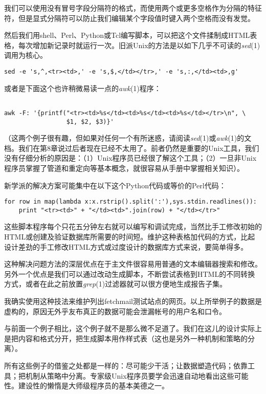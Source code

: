 \documentclass[12pt,oneside]{ctexbook}
\begin{document}
\begin{common-format}
我们可以使用没有冒号字段分隔符的格式，而使用两个或更多空格作为分隔的特征符，但是显式分隔符可以防止我们编辑某个字段值时键入两个空格而没有发觉。

然后我们用shell、Perl、Python或Tcl编写脚本，可以把这个文件揉制成HTML表格，每次增加新记录时就运行一次。旧派Unix的方法是以如下几乎不可读的\textit{sed}(1)调用为核心。

\begin{Verbatim}
sed -e 's,^,<tr><td>,' -e 's,$,</td></tr>,' -e 's,:,</td><td>,g'
\end{Verbatim}

或者是下面这个也许稍微易读一点的\textit{awk}(1)程序：
\begin{Verbatim}

awk -F: '{printf("<tr><td>%s</td><td>%s</td><td>%s</td></tr>\n", \
                 $1, $2, $3)}'
\end{Verbatim}

（这两个例子很有趣，但如果对任何一个有所迷惑，请阅读\textit{sed}(1)或\textit{awk}(1)的文档。我们在第8章说过后者现在已经不太用了。前者仍然是重要的Unix工具，我们没有仔细分析的原因是：（1）Unix程序员已经很了解这个工具；（2）一旦非Unix程序员掌握了管道和重定向等基本概念，就很容易从手册中掌握相关知识）。

新学派的解决方案可能集中在以下这个Python代码或等价的Perl代码：
\begin{Verbatim}
for row in map(lambda x:x.rstrip().split(':'),sys.stdin.readlines()):
    print "<tr><td>" + "</td><td>".join(row) + "</td></tr>"
\end{Verbatim}

这些脚本程序每个只花五分钟左右就可以编写和调试完成，当然比手工修改初始的HTML或创建及验证数据库所需要的时间短。维护这种表格加代码的方式，比起设计差劲的手工修改HTML方式或过度设计的数据库方式来说，要简单得多。

这种解决问题方法的深层优点在于主文件很容易用普通的文本编辑器搜索和修改。另外一个优点是我们可以通过改动生成脚本，不断尝试表格到HTML的不同转换方式，或者在此之前放置\textit{grep}(1)过滤器就可以很方便地生成报告子集。

我确实使用这种技法来维护列出fetchmail测试站点的网页。以上所举例子的数据是虚构的，原因无外乎友布真正的数据可能会泄漏帐号的用户名和口令。

与前面一个例子相比，这个例子就不是那么微不足道了。我们在这儿的设计实际上是把内容和格式分开，把生成脚本用作样式表（这也是另外一种机制和策略的分离）。

所有这些例子的借鉴之处都是一样的：尽可能少干活；让数据塑造代码；依靠工具；把机制从策略中分离。专家级Unix程序员要学会迅速自动地看出这些可能性。建设性的懒惰是大师级程序员的基本美德之一。




\end{common-format}
\end{document}
